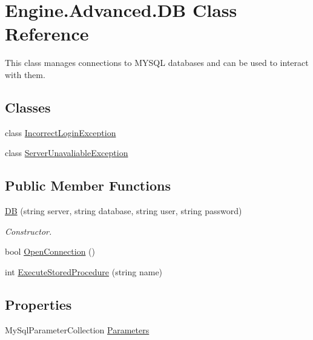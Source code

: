 \hypertarget{class_engine_1_1_advanced_1_1_d_b}{}\section{Engine.\+Advanced.\+DB Class Reference}
\label{class_engine_1_1_advanced_1_1_d_b}


This class manages connections to M\+Y\+S\+QL databases and can be used to interact with them.  


\subsection*{Classes}
\begin{DoxyCompactItemize}
\item 
class \mbox{\hyperlink{class_engine_1_1_advanced_1_1_d_b_1_1_incorrect_login_exception}{Incorrect\+Login\+Exception}}
\item 
class \mbox{\hyperlink{class_engine_1_1_advanced_1_1_d_b_1_1_server_unavaliable_exception}{Server\+Unavaliable\+Exception}}
\end{DoxyCompactItemize}
\subsection*{Public Member Functions}
\begin{DoxyCompactItemize}
\item 
\mbox{\hyperlink{class_engine_1_1_advanced_1_1_d_b_ae7582117ffbcbaf54f9659324aafb15a}{DB}} (string server, string database, string user, string password)
\begin{DoxyCompactList}\small\item\em Constructor. \end{DoxyCompactList}\item 
bool \mbox{\hyperlink{class_engine_1_1_advanced_1_1_d_b_abe509fe539b3198ccf2bd6a7135f630e}{Open\+Connection}} ()
\item 
int \mbox{\hyperlink{class_engine_1_1_advanced_1_1_d_b_aa98aac7e9cf14375b9cb855be9f93d6b}{Execute\+Stored\+Procedure}} (string name)
\end{DoxyCompactItemize}
\subsection*{Properties}
\begin{DoxyCompactItemize}
\item 
My\+Sql\+Parameter\+Collection \mbox{\hyperlink{class_engine_1_1_advanced_1_1_d_b_ada97e9e083969259f1f83eec7e6ac872}{Parameters}}
\end{DoxyCompactItemize}



